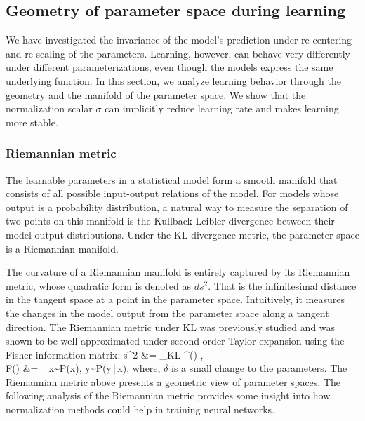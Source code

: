 \documentclass{article}
\newcommand{\T}{\top}
\def\bea#1\eea{\begin{align}#1\end{align}}
\newcommand{\fisher}{{F}}
\newcommand{\data}{{\bold x}}
\newcommand{\expectation}{\mathop{\mathbb{E}}}
\newcommand{\kldiv}{\mathrm{D}_{\rm KL}}
\newcommand{\given}{\,|\,}
\newcommand{\target}{y}
\begin{document}
\subsection{Geometry of parameter space during learning}
We have investigated the invariance of the model's prediction under re-centering and re-scaling of the parameters. Learning, however, can behave very differently under different parameterizations, even though the models express the same underlying function. In this section, we analyze learning behavior through the geometry and the manifold of the parameter space. We show that the normalization scalar $\sigma$ can implicitly reduce learning rate and makes learning more stable.

\subsubsection{Riemannian metric}
The learnable parameters in a statistical model form a smooth manifold that consists of all possible input-output relations of the model. For models whose output is a probability distribution, a natural way to measure the separation of two points on this manifold is the Kullback-Leibler divergence between their model output distributions. Under the KL divergence metric, the parameter space is a Riemannian manifold.

The curvature of a Riemannian manifold is entirely captured by its Riemannian metric, whose quadratic form is denoted as $ds^2$. That is the infinitesimal distance in the tangent space at a point in the parameter space. Intuitively, it measures the changes in the model output from the parameter space along a tangent direction. The Riemannian metric under KL was previously studied \citep{amari1998natural} and was shown to be well approximated under second order Taylor expansion using the Fisher information matrix: 
\bea
ds^2 &= \kldiv\big[P(\target \given \data;\  \theta)\| P(\target \given \data ;\  \theta+\delta)\big] \approx {} \delta^\T \fisher(\theta) \delta, \\
\fisher(\theta) &= \expectation_{\data \sim P(\data), \target \sim P(\target\given\data)}\left[{\partial \log P(\target \given \data ;\ \theta) \over \partial \theta}{\partial \log P(\target \given \data ;\ \theta) \over \partial \theta}^\T\right],
\eea
where, $\delta$ is a small change to the parameters. The Riemannian metric above presents a geometric view of parameter spaces. The following analysis of the Riemannian metric provides some insight into how normalization methods could help in training neural networks.
\end{document}
